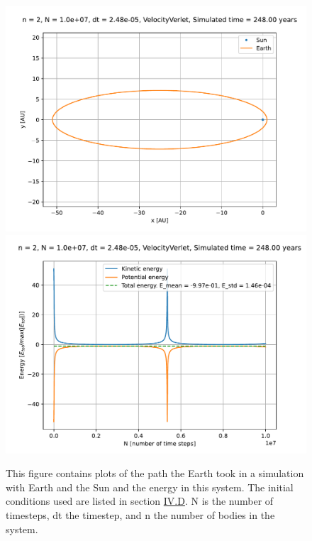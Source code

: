 \documentclass[reprint,english,notitlepage]{revtex4-1}  %
\begin{document}
\begin{figure}[H]
\includegraphics[width=\columnwidth]{../data/figures/escapevelocity/se_esc_8-8_orbit2D.pdf}
\includegraphics[width=\columnwidth]{../data/figures/escapevelocity/se_esc_8-8_energy.pdf}
\caption{This figure contains plots of the path the Earth took in a simulation with Earth and the Sun and the energy in this system. The initial conditions used are listed in section \hyperref[sec:IV:d]{IV.D}. N is the number of timesteps, dt the timestep, and n the number of bodies in the system.}
\label{fig:escvel_88}
\end{figure}
\end{document}
